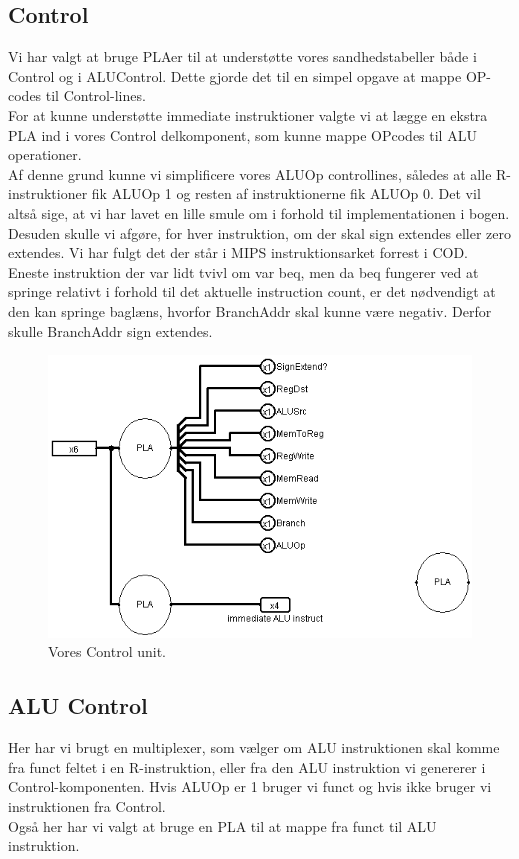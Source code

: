 \documentclass [10pt,a4paper]{article}
\begin{document}
\subsection*{Control}
Vi har valgt at bruge PLAer til at understøtte vores sandhedstabeller
både i Control og i ALUControl. Dette gjorde det til en simpel opgave
at mappe OP-codes til Control-lines.\\
For at kunne understøtte immediate instruktioner valgte vi at lægge en
ekstra PLA ind i vores Control delkomponent, som kunne mappe OPcodes
til ALU operationer. \\
Af denne grund kunne vi simplificere vores ALUOp controllines, således
at alle R-instruktioner fik ALUOp 1 og resten af instruktionerne fik
ALUOp 0. Det vil altså sige, at vi har lavet en lille smule om i
forhold til implementationen i bogen. \\
Desuden skulle vi afgøre, for hver instruktion, om der skal sign
extendes eller zero extendes. Vi har fulgt det der står i MIPS
instruktionsarket forrest i COD. Eneste instruktion der var lidt tvivl
om var beq, men da beq fungerer ved at springe relativt i forhold til
det aktuelle instruction count, er det nødvendigt at den kan springe
baglæns, hvorfor BranchAddr skal kunne være negativ. Derfor skulle
BranchAddr sign extendes.

\begin{figure}[h!]
  \centering  
    \includegraphics[scale=0.7]{control.png}
  \caption{Vores Control unit.}
\end{figure}

\subsection*{ALU Control}
Her har vi brugt en multiplexer, som vælger om ALU instruktionen skal
komme fra funct feltet i en R-instruktion, eller fra den ALU
instruktion vi genererer i Control-komponenten. Hvis ALUOp er 1 bruger
vi funct og hvis ikke bruger vi instruktionen fra Control.\\
Også her har vi valgt at bruge en PLA til at mappe fra funct til ALU
instruktion.
\end{document}
